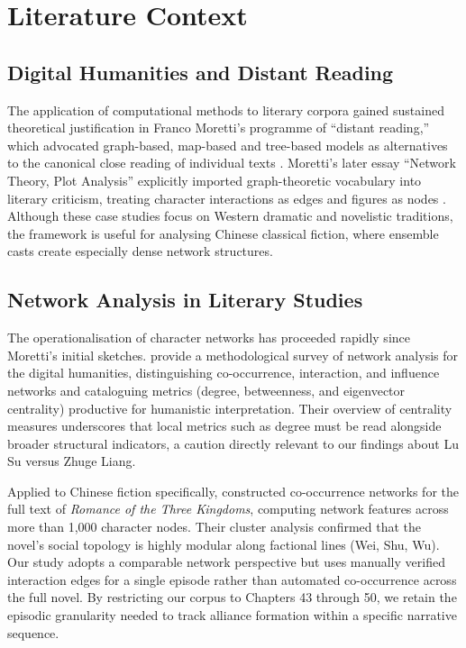 \documentclass[12pt, a4paper]{article}
\newcommand{\booktitle}[1]{\textit{#1}}
\begin{document}
 
\section{Literature Context}
\label{sec:literature}

\subsection{Digital Humanities and Distant Reading}

The application of computational methods to literary corpora gained sustained
theoretical justification in Franco Moretti's programme of ``distant reading,''
which advocated graph-based, map-based and tree-based models as alternatives to
the canonical close reading of individual texts
\autocite{moretti2005graphs}.
Moretti's later essay ``Network Theory, Plot Analysis'' explicitly imported
graph-theoretic vocabulary into literary criticism, treating character
interactions as edges and figures as nodes \autocite{moretti2013distant}.
Although these case studies focus on Western dramatic and novelistic traditions, the framework is useful for analysing Chinese classical fiction, where ensemble casts create especially dense network structures.

\subsection{Network Analysis in Literary Studies}

The operationalisation of character networks has proceeded rapidly since
Moretti's initial sketches.
\textcite{painter2019network} provide a methodological survey of network
analysis for the digital humanities, distinguishing co-occurrence,
interaction, and influence networks and cataloguing metrics (degree,
betweenness, and eigenvector centrality) productive for humanistic
interpretation.
Their overview of centrality measures underscores that local metrics such as
degree must be read alongside broader structural indicators, a caution directly
relevant to our findings about Lu Su versus Zhuge Liang.

Applied to Chinese fiction specifically,
\textcite{fan2021coword} constructed co-occurrence networks for the full text
of \booktitle{Romance of the Three Kingdoms}, computing network features across
more than 1,000 character nodes.
Their cluster analysis confirmed that the novel's social topology is highly
modular along factional lines (Wei, Shu, Wu).
Our study adopts a comparable network perspective but uses manually verified
interaction edges for a single episode rather than automated co-occurrence
across the full novel.
By restricting our corpus to Chapters 43 through 50, we retain the episodic granularity needed to track alliance formation within a specific narrative sequence. 
\end{document}
